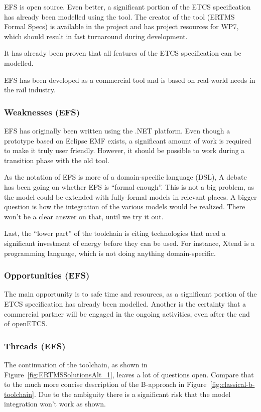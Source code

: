 EFS is open source.  Even better, a significant portion of the ETCS specification has already been modelled using the tool.  The creator of the tool (ERTMS Formal Specs) is available in the project and has project resources for WP7, which should result in fast turnaround during development.

It has already been proven that all features of the ETCS specification can be modelled.

EFS has been developed as a commercial tool and is based on real-world needs in the rail industry.

\subsubsection{Weaknesses (EFS)}

EFS has originally been written using the .NET platform.  Even though a prototype based on Eclipse EMF exists, a significant amount of work is required to make it truly user friendly.  However, it should be possible to work during a transition phase with the old tool.

As the notation of EFS is more of a domain-specific language (DSL), A debate has been going on whether EFS is ``formal enough''.  This is not a big problem, as the model could be extended with fully-formal models in relevant places.  A bigger question is how the integration of the various models would be realized.  There won't be a clear answer on that, until we try it out.

Last, the ``lower part'' of the toolchain is citing technologies that need a significant investment of energy before they can be used.  For instance, Xtend is a programming language, which is not doing anything domain-specific.

\subsubsection{Opportunities (EFS)}

The main opportunity is to safe time and resources, as a significant portion of the ETCS specification has already been modelled.  Another is the certainty that a commercial partner will be engaged in the ongoing activities, even after the end of openETCS.

\subsubsection{Threads (EFS)}

The continuation of the toolchain, as shown in Figure~\ref{fig:ERTMSSolutionsAlt_1}, leaves a lot of questions open.  Compare that to the much more concise description of the B-approach in Figure~\ref{fig:classical-b-toolchain}.  Due to the ambiguity there is a significant risk that the model integration won't work as shown.

